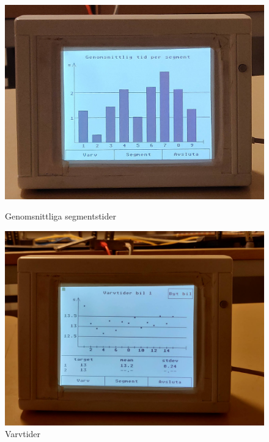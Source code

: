 \begin{figure}
	\centering
	\includegraphics[width=0.75\linewidth] {Figures/genomsnitt_segment}
	\caption{Genomsnittliga segmentstider}
	\label{fig:display-seg}
	
	\vspace*{2\floatsep}%
	
	\centering
	\includegraphics [width=0.75\linewidth] {Figures/varvtider}
	\caption{Varvtider}
	\label{fig:display-lap}
\end{figure}
